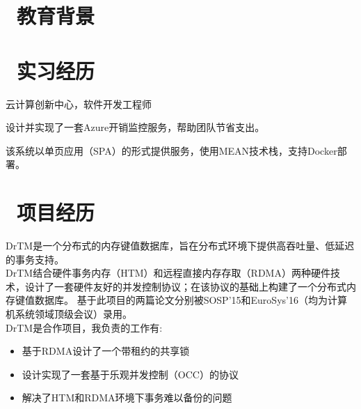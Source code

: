 \documentclass{resume}
\begin{document}


 
\section{\faGraduationCap\ 教育背景}

\section{\faBriefcase\ 实习经历}
 {云计算创新中心，软件开发工程师}

设计并实现了一套Azure开销监控服务，帮助团队节省支出。

该系统以单页应用（SPA）的形式提供服务，使用MEAN技术栈，支持Docker部署。

\section{\faUsers\ 项目经历}
DrTM是一个分布式的内存键值数据库，旨在分布式环境下提供高吞吐量、低延迟的事务支持。
\\[5pt]
DrTM结合硬件事务内存（HTM）和远程直接内存存取（RDMA）两种硬件技术，设计了一套硬件友好的并发控制协议；在该协议的基础上构建了一个分布式内存键值数据库。
基于此项目的两篇论文分别被SOSP’15和EuroSys’16（均为计算机系统领域顶级会议）录用。
\\[5pt]
DrTM是合作项目，我负责的工作有:
\begin{itemize}[parsep=0.5ex]
  \item 基于RDMA设计了一个带租约的共享锁
  \item 设计实现了一套基于乐观并发控制（OCC）的协议
  \item 解决了HTM和RDMA环境下事务难以备份的问题
\end{itemize}
\end{document}
